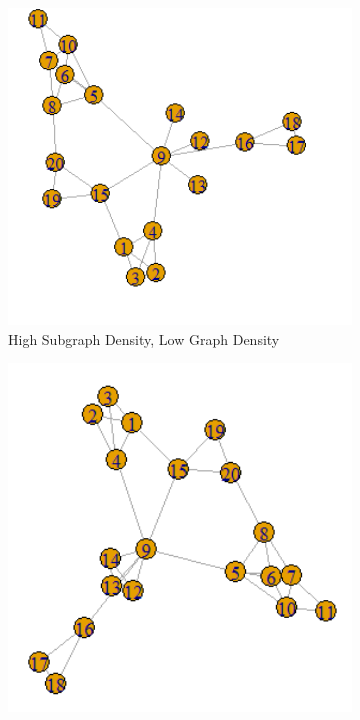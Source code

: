 \documentclass[12pt]{article}
\begin{document}
\begin{figure}
    \captionsetup[subfigure]{font=footnotesize,labelfont=footnotesize}
    \centering
     \begin{subfigure}[b]{0.45\textwidth}
        \includegraphics[width=1.0\textwidth]{Plots/political1.png}
            \caption{High Subgraph Density, Low Graph Density}
            \label{fig:Placehold}
    \end{subfigure}
     \begin{subfigure}[b]{0.45\textwidth}
        \includegraphics[width=1.0\textwidth]{Plots/political2.png}

\end{subfigure}
\end{figure}
\end{document}
